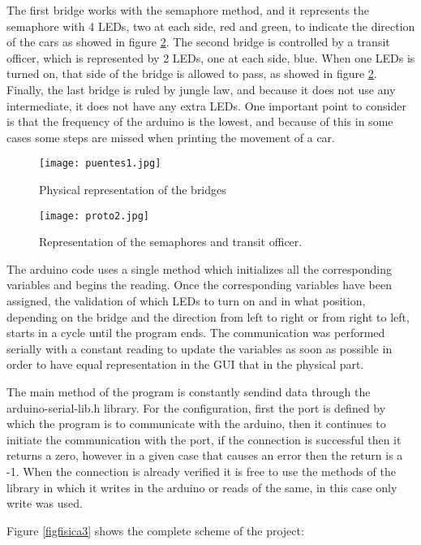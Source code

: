 \documentclass[a4paper,9pt]{article}
\begin{document}
The first bridge works with the semaphore method, and it represents the semaphore with 4 LEDs, two at each side, red and green, to indicate the direction of the cars as showed in figure \ref{figProto2}. The second bridge is controlled by a transit officer, which is represented by 2 LEDs, one at each side, blue. When one LEDs is turned on, that side of the bridge is allowed to pass, as showed in figure \ref{figProto2}. Finally, the last bridge is ruled by jungle law, and because it does not use any intermediate, it does not have any extra LEDs. One important point to consider is that the frequency of the arduino is the lowest, and because of this in some cases some steps are missed when printing the movement of a car. 

 \begin{figure}[H]
\centering
\texttt{[image: puentes1.jpg]}
\caption{Physical representation of the bridges }
\label{figPuentes1}
 \end{figure} \bigskip
 
  \begin{figure}[H]
\centering
\texttt{[image: proto2.jpg]}
\caption{Representation of the semaphores and transit officer. }
\label{figProto2}
 \end{figure} \bigskip

The arduino code uses a single method which initializes all the corresponding variables and begins the reading. Once the corresponding variables have been assigned, the validation of which LEDs to turn on and in what position, depending on the bridge and the direction from left to right or from right to left, starts in a cycle until the program ends. The communication was performed serially with a constant reading to update the variables as soon as possible in order to have equal representation in the GUI that in the physical part.

The main method of the program is constantly sendind data through the arduino-serial-lib.h library. For the configuration, first the port is defined by which the program is to communicate with the arduino, then it continues to initiate the communication with the port, if the connection is successful then it returns a zero, however in a given case that causes an error then the return is a -1. When the connection is already verified it is free to use the methods of the library in which it writes in the arduino or reads of the same, in this case only write was used.

Figure \ref{figfisica3} shows the complete scheme of the project: 
\end{document}
